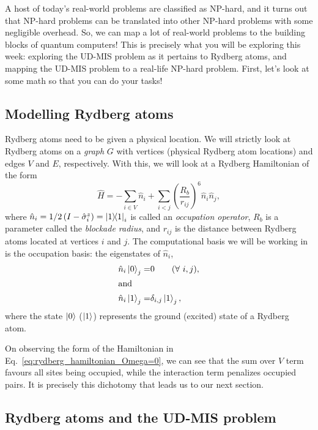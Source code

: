 \documentclass[12pt]{article}
\begin{document}
A host of today's real-world problems are classified as NP-hard, and it turns out that NP-hard problems can be translated into other NP-hard problems with some negligible overhead.
So, we can map a lot of real-world problems to the building blocks of quantum computers! 
This is precisely what you will be exploring this week: exploring the UD-MIS problem as it pertains to Rydberg atoms, and mapping the UD-MIS problem to a real-life NP-hard problem.
First, let's look at some math so that you can do your tasks!

\subsection*{Modelling Rydberg atoms}

Rydberg atoms need to be given a physical location. 
We will strictly look at Rydberg atoms on a {\it graph} $G$ with vertices (physical Rydberg atom locations) and edges $V$ and $E$, respectively.
With this, we will look at a Rydberg Hamiltonian of the form
\begin{equation} \label{eq:rydberg_hamiltonian_Omega=0}
	\hat{H} = -\sum_{i \in V} \hat{n}_i + \sum_{ i < j } \left( \frac{R_b}{r_{ij}} \right)^6 \hat{n}_i \hat{n}_j,
\end{equation}
where $\hat{n}_i = 1/2 \left( I - \hat{\sigma}_i^z \right) = \ketbra{1}{1}_i$ is called an {\it occupation operator}, $R_b$ is a parameter called the {\it blockade radius}, and $r_{ij}$ is the distance between Rydberg atoms located at vertices $i$ and $j$.
The computational basis we will be working in is the occupation basis: the eigenstates of $\hat{n}_i$,
\begin{subequations} \label{eq:occupation_basis}
    \begin{align} 
        \hat{n}_i \ket{0}_j =& 0 \qquad (\text{$\forall$ $i,j$}), \\
        \intertext{and}
        \hat{n}_i \ket{1}_j =& \delta_{i,j}\ket{1}_j,
    \end{align}
\end{subequations}
where the state $\ket{0}$ ($\ket{1}$) represents the ground (excited) state of a Rydberg atom.

On observing the form of the Hamiltonian in Eq.~\ref{eq:rydberg_hamiltonian_Omega=0}, we can see that the sum over $V$ term favours all sites being occupied, while the interaction term penalizes occupied pairs.
It is precisely this dichotomy that leads us to our next section.

\subsection*{Rydberg atoms and the UD-MIS problem}
\end{document}
